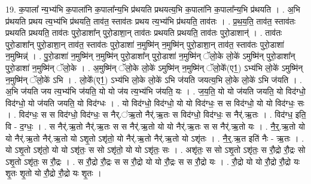 \documentclass[17pt]{extarticle}
\begin{document}
19. क॒पाला᳚ न्य॒भ्य॑भि क॒पाला॑नि क॒पाला᳚न्य॒भि प्र॑थयति प्रथयत्य॒भि क॒पाला॑नि क॒पाला᳚न्य॒भि प्र॑थयति । . अ॒भि प्र॑थयति प्रथय त्य॒भ्य॑भि प्र॑थयति॒ ताव॑त॒ स्ताव॑तः प्रथय त्य॒भ्य॑भि प्र॑थयति॒ ताव॑तः । . प्र॒थ॒य॒ति॒ ताव॑त॒ स्ताव॑तः प्रथयति प्रथयति॒ ताव॑तः पुरो॒डाशा᳚न् पुरो॒डाशा॒न् ताव॑तः प्रथयति प्रथयति॒ ताव॑तः पुरो॒डाशान्॑ । . ताव॑तः पुरो॒डाशा᳚न् पुरो॒डाशा॒न् ताव॑त॒ स्ताव॑तः पुरो॒डाशा॑ न॒मुष्मि॑न् न॒मुष्मि॑न् पुरो॒डाशा॒न् ताव॑त॒ स्ताव॑तः पुरो॒डाशा॑ न॒मुष्मिन्न्॑ । . पु॒रो॒डाशा॑ न॒मुष्मि॑न् न॒मुष्मि॑न् पुरो॒डाशा᳚न् पुरो॒डाशा॑ न॒मुष्मि॑न् ॅलो॒के लो॒के॑ ऽमुष्मि॑न् पुरो॒डाशा᳚न् पुरो॒डाशा॑ न॒मुष्मि॑न् ॅलो॒के । . अ॒मुष्मि॑न् ॅलो॒के लो॒के॑ ऽमुष्मि॑न् न॒मुष्मि॑न् ॅलो॒के᳚(ए1॒) ऽभ्य॑भि लो॒के॑ ऽमुष्मि॑न् न॒मुष्मि॑न् ॅलो॒के॑ ऽभि । . लो॒के᳚(ए1॒) ऽभ्य॑भि लो॒के लो॒के॑ ऽभि ज॑यति जयत्य॒भि लो॒के लो॒के॑ ऽभि ज॑यति । . अ॒भि ज॑यति जय त्य॒भ्य॑भि ज॑यति॒ यो यो ज॑य त्य॒भ्य॑भि ज॑यति॒ यः । . ज॒य॒ति॒ यो यो ज॑यति जयति॒ यो विद॑ग्धो॒ विद॑ग्धो॒ यो ज॑यति जयति॒ यो विद॑ग्धः । . यो विद॑ग्धो॒ विद॑ग्धो॒ यो यो विद॑ग्धः॒ स स विद॑ग्धो॒ यो यो विद॑ग्धः॒ सः । . विद॑ग्धः॒ स स विद॑ग्धो॒ विद॑ग्धः॒ स नैर्.॑ऋ॒तो नैर्॑.ऋ॒तः स विद॑ग्धो॒ विद॑ग्धः॒ स नैर्॑.ऋ॒तः । . विद॑ग्ध॒ इति॒ वि - द॒ग्धः॒ । . स नैर्॑.ऋ॒तो नैर्॑.ऋ॒तः स स नैर्॑.ऋ॒तो यो यो नैर्॑.ऋ॒तः स स नैर्॑.ऋ॒तो यः । . नै॒र्॒.ऋ॒तो यो यो नैर्॑.ऋ॒तो नैर्॑.ऋ॒तो यो ऽशृ॒तो ऽशृ॑तो॒ यो नैर्॑.ऋ॒तो नैर्॑.ऋ॒तो यो ऽशृ॑तः । . नै॒र्॒.ऋ॒त इति॑ नैः - ऋ॒तः । . यो ऽशृ॒तो ऽशृ॑तो॒ यो यो ऽशृ॑तः॒ स सो ऽशृ॑तो॒ यो यो ऽशृ॑तः॒ सः । . अशृ॑तः॒ स सो ऽशृ॒तो ऽशृ॑तः॒ स रौ॒द्रो रौ॒द्रः सो ऽशृ॒तो ऽशृ॑तः॒ स रौ॒द्रः । . स रौ॒द्रो रौ॒द्रः स स रौ॒द्रो यो यो रौ॒द्रः स स रौ॒द्रो यः । . रौ॒द्रो यो यो रौ॒द्रो रौ॒द्रो यः शृ॒तः शृ॒तो यो रौ॒द्रो रौ॒द्रो यः शृ॒तः । \newline
\end{document}
